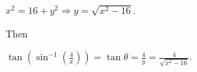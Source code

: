 \documentclass[handout,nooutcomes]{ximera}
\begin{document}
\begin{problem}
\begin{enumerate}
\begin{freeResponse}
			$x^2 = 16 + y^2 \Longrightarrow y = \sqrt{x^2 - 16}$.
			
			Then
			
			$ \tan \left( \sin^{-1} \left( \frac{4}{x} \right) \right) = \tan \theta = \frac{4}{y} = \frac{4}{\sqrt{x^2 - 16}}  $.
			 \end{freeResponse}
			
			\end{enumerate}
			
\end{problem}
			
			
			

	










								
				
				
	
\end{document}
